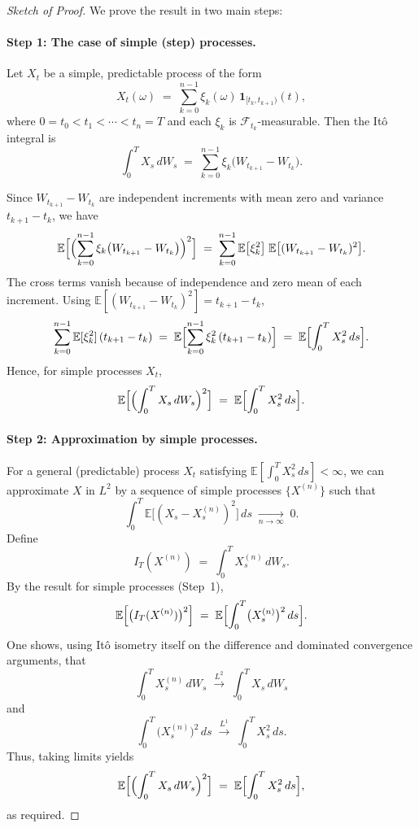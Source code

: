 \documentclass[a4paper,11pt]{book}
\theoremstyle{definition}
\theoremstyle{remark}
\begin{document}
\begin{proof}[Sketch of Proof]
We prove the result in two main steps:

\paragraph{Step 1: The case of simple (step) processes.}
Let $X_t$ be a simple, predictable process of the form
\[
  X_t(\omega) \;=\; \sum_{k=0}^{n-1} \xi_k(\omega)\,\mathbf{1}_{[t_k, t_{k+1})}(t),
\]
where $0 = t_0 < t_1 < \cdots < t_n = T$ and each $\xi_k$ is 
$\mathcal{F}_{t_k}$-measurable. Then the It\^o integral is
\[
  \int_0^T X_s \, dW_s 
  \;=\; \sum_{k=0}^{n-1} \xi_k \bigl(W_{t_{k+1}} - W_{t_k}\bigr).
\]

Since $W_{t_{k+1}} - W_{t_k}$ are independent increments with mean zero 
and variance $t_{k+1}-t_k$, we have
\[
  \mathbb{E}\Bigl[\Bigl(\sum_{k=0}^{n-1} 
    \xi_k \bigl(W_{t_{k+1}} - W_{t_k}\bigr)\Bigr)^2\Bigr]
  \;=\;
  \sum_{k=0}^{n-1} 
    \mathbb{E}\bigl[\xi_k^2\bigr]\;\mathbb{E}\bigl[(W_{t_{k+1}} - W_{t_k})^2\bigr].
\]
The cross terms vanish because of independence and zero mean of each increment. 
Using $\mathbb{E}[(W_{t_{k+1}} - W_{t_k})^2] = t_{k+1} - t_k$,
\[
  \sum_{k=0}^{n-1} \mathbb{E}[\xi_k^2]\,(t_{k+1} - t_k)
  \;=\;
  \mathbb{E}\Bigl[ \sum_{k=0}^{n-1} \xi_k^2\,(t_{k+1} - t_k) \Bigr]
  \;=\;
  \mathbb{E}\Bigl[\int_0^T X_s^2 \, ds\Bigr].
\]
Hence, for simple processes $X_t$,
\[
  \mathbb{E}\Bigl[\Bigl(\int_0^T X_s \, dW_s\Bigr)^2\Bigr]
  \;=\;
  \mathbb{E}\Bigl[\int_0^T X_s^2 \, ds\Bigr].
\]

\paragraph{Step 2: Approximation by simple processes.}
For a general (predictable) process $X_t$ satisfying 
$\mathbb{E}[\int_0^T X_s^2\,ds] < \infty$, we can approximate $X$ in $L^2$ 
by a sequence of simple processes $\{X^{(n)}\}$ such that
\[
   \int_0^T \mathbb{E}\bigl[(X_s - X_s^{(n)})^2\bigr]\,ds 
   \;\xrightarrow[n\to\infty]{}\; 0.
\]
Define 
\[
   I_T(X^{(n)}) \;=\; \int_0^T X_s^{(n)} \, dW_s.
\]
By the result for simple processes (Step~1),
\[
   \mathbb{E}\Bigl[\bigl(I_T(X^{(n)})\bigr)^2\Bigr]
   \;=\;
   \mathbb{E}\Bigl[\int_0^T \bigl(X_s^{(n)}\bigr)^2 \, ds\Bigr].
\]
One shows, using It\^o isometry itself on the difference and 
dominated convergence arguments, that
\[
   \int_0^T X_s^{(n)} \, dW_s 
   \;\xrightarrow{L^2}\;
   \int_0^T X_s \, dW_s
\]
and
\[
   \int_0^T \bigl(X_s^{(n)}\bigr)^2 \, ds
   \;\xrightarrow{L^1}\;
   \int_0^T X_s^2 \, ds.
\]
Thus, taking limits yields
\[
   \mathbb{E}\Bigl[\Bigl(\int_0^T X_s \, dW_s\Bigr)^2\Bigr]
   \;=\;
   \mathbb{E}\Bigl[\int_0^T X_s^2 \, ds\Bigr],
\]
as required.
\end{proof}
\end{document}
